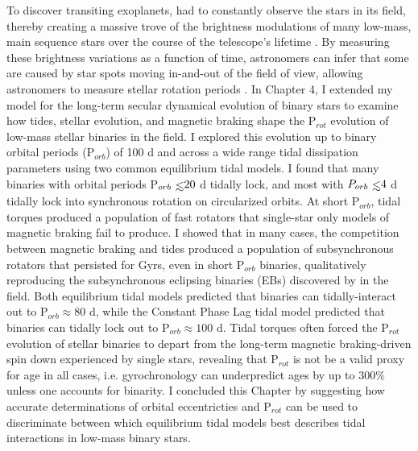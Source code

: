 To discover transiting exoplanets, \kepler had to constantly observe the stars in its field, thereby creating a massive trove of the brightness modulations of many low-mass, main sequence stars over the course of the telescope's lifetime \citep{Borucki2003,Borucki2010}. By measuring these brightness variations as a function of time, astronomers can infer that some are caused by star spots moving in-and-out of the field of view, allowing astronomers to measure stellar rotation periods \citep[P$_{rot}$, see][]{McQuillan2014}. In Chapter 4, I extended my model for the long-term secular dynamical evolution of binary stars to examine how tides, stellar evolution, and magnetic braking shape the P$_{rot}$ evolution of low-mass stellar binaries in the \kepler field. I explored this evolution up to binary orbital periods (P$_{orb}$) of 100 d and across a wide range tidal dissipation parameters using two common equilibrium tidal models. I found that many binaries with orbital periods P$_{orb} \lsim 20$ d tidally lock, and most with $P_{orb} \lsim 4$ d tidally lock into synchronous rotation on circularized orbits. At short P$_{orb}$, tidal torques produced a population of fast rotators that single-star only models of magnetic braking fail to produce.  I showed that in many cases, the competition between magnetic braking and tides produced a population of subsynchronous rotators that persisted for Gyrs, even in short P$_{orb}$ binaries, qualitatively reproducing the subsynchronous eclipsing binaries (EBs) discovered by \citet{Lurie2017} in the \kepler field. Both equilibrium tidal models predicted that binaries can tidally-interact out to P$_{orb} \approx 80$ d, while the Constant Phase Lag tidal model predicted that binaries can tidally lock out to P$_{orb} \approx 100$ d. Tidal torques often forced the P$_{rot}$ evolution of stellar binaries to depart from the long-term magnetic braking-driven spin down experienced by single stars, revealing that P$_{rot}$ is not be a valid proxy for age in all cases, i.e. gyrochronology can underpredict ages by up to $300\%$ unless one accounts for binarity. I concluded this Chapter by suggesting how accurate determinations of orbital eccentricties and P$_{rot}$ can be used to discriminate between which equilibrium tidal models best describes tidal interactions in low-mass binary stars.
 
